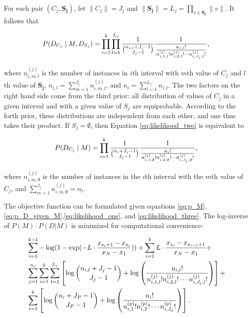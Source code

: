For each pair $(C_j, \boldsymbol{S_j})$, let $\|C_j \| = J_j$ and $\| \boldsymbol{S_j} \| = L_j = \prod_{v \in \boldsymbol{S_j}} \| v \|$. It follows that

\begin{equation}
\label{eq:likelihood_two}
P(D_{C_j}  \mid M, D_{S_j}) =
\prod_{i=1}^{k} \prod_{l=1}^{L_j} {{1}\over{{n_{i,l} + J_j - 1}\choose{J_j-1}}}
{{1}\over{ {{n_{i,l}}!}\over{ {n^{(j)}_{i,1,l} !} {n^{(j)}_{i,2,l} !} \cdots {n^{(j)}_{i,J_j,l} !}}  }}\text{,}
\end{equation}

\noindent
where $n^{(j)}_{i,m,l}$ is the number of instances in $i$th interval with $m$th value of $C_j$ and $l$th value of $\boldsymbol{S_j}$, $n_{i,l} = \sum_{m=1}^{J_j} n^{(j)}_{i,m,l}$, and $n_i = \sum_{l=1}^{L_j} n_{i,l}$.
The two factors on the right hand side come from the third prior: all distribution of values of $C_j$ in a given interval and with a given value of $S_j$ are equiprobable. According to the forth prior, these distributions are independent from each other, and one thus takes their product. If $S_j = \emptyset$, then Equation \ref{eq:likelihood_two} is equivalent to

\begin{equation}
\label{eq:likelihood_three}
P(D_{C_j}  \mid M) =
\prod_{i=1}^{k}  {{1}\over{{n_{i} + J_j - 1}\choose{J_j-1}}}
{{1}\over{ {{n_{i}}!}\over{ {n^{(j)}_{i,1,\emptyset} !} {n^{(j)}_{i,2,\emptyset} !} \cdots {n^{(j)}_{i,J_j,\emptyset} !}}  }}\text{,}
\end{equation}

\noindent
where $n^{(j)}_{i,m,\emptyset}$ is the number of instances in the $i$th interval with the $m$th value of $C_j$, and $\sum_{m=1}^{J_j} n^{(j)}_{i,m,\emptyset} = n_i$.

The objective function can be formulated given equations \ref{eq:p_M}, \ref{eq:p_D_given_M},\ref{eq:likelihood_one}, and \ref{eq:likelihood_three}.
The log-inverse of $P(M) \cdot P(D|M)$ is minimized for computational convenience:

\begin{equation}
\label{eq:opt_prob}
\begin{aligned}
& \sum_{i=1}^{k-1} - \log(1 - {\exp(- L \cdot {{x_{s_i+1} - x_{s_i}}\over{x_N - x_1}})}) +  \sum_{i=1}^{k} L \cdot {{x_{s_{i}} - x_{s_{i-1} + 1}}\over{x_N - x_1}} +\\
&  \sum_{j=1}^{n_c} \sum_{i=1}^{k}  \sum_{l=1}^{L_j} \left[  \log{{n_{i,l} + J_j - 1}\choose{J_j-1}} + \log \left( { {{n_{i,l}}!}\over{ {n^{(j)}_{i,1,l} !} {n^{(j)}_{i,2,l} !} \cdots {n^{(j)}_{i,J_j,l} !}} } \right) \right] + \\
& \sum_{i=1}^k \left[  \log {{n_{i} + J_P - 1}\choose{J_P-1}} + \log \left( { {{n_i}!}\over{ {n^{(p)}_{i,1} !} {n^{(p)}_{i,2} !} \cdots {n^{(p)}_{i,J_p} !}} } \right) \right]\text{.}
\end{aligned}
\end{equation}

